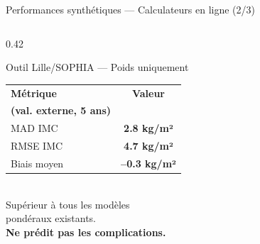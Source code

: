 \documentclass[aspectratio=169]{beamer}
\begin{document}
\begin{frame}{Performances synthétiques --- Calculateurs en ligne (2/3)}
\begin{columns}[T]
\begin{column}{0.42\textwidth}
\begin{block}{Outil Lille/SOPHIA --- Poids uniquement}
\begin{tabular}{lc}
          \textbf{Métrique} & \textbf{Valeur} \\
          \textbf{(val. externe, 5 ans)} & \\
          \midrule
          MAD IMC
            & \textcolor{vertdoux}{\textbf{2.8 kg/m²}} \\[3pt]
          RMSE IMC
            & \textcolor{orangemod}{\textbf{4.7 kg/m²}} \\[3pt]
          Biais moyen
            & \textcolor{vertdoux}{\textbf{--0.3 kg/m²}} \\
          \bottomrule
        \end{tabular}
        \vspace{4pt}\\
        Supérieur à tous les modèles\\
        pondéraux existants.\\[4pt]
        \textcolor{rougealerte}{\textbf{Ne prédit pas les complications.}}
      \end{block}
    \end{column}
  \end{columns}
\end{frame}
\end{document}
